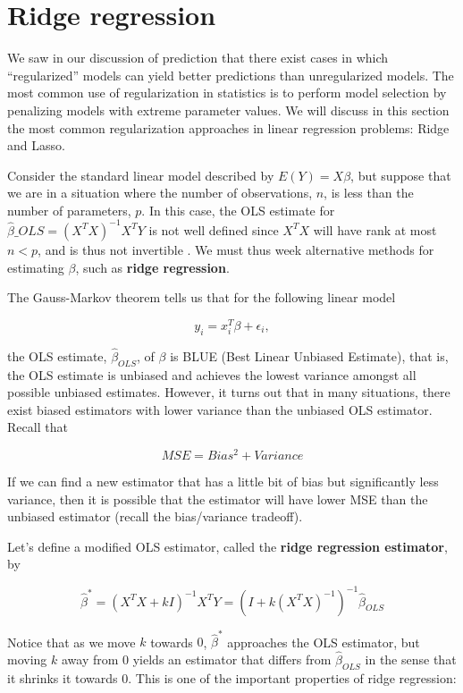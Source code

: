 \chapter{Ridge regression}
\label{ch:ridge}




We saw in our discussion of prediction that there exist cases in which ``regularized'' models can yield better predictions than unregularized models. The most common use of regularization in statistics is to perform model selection by penalizing models with extreme parameter values. We will discuss in this section the most common regularization approaches in linear regression problems: Ridge and Lasso.


Consider the standard linear model described by $E(Y) = X \beta$, but suppose that we are in a situation where the number of observations, $n$, is less than the number of parameters, $p$. In this case, the OLS estimate for $\hat{\beta}\_{OLS} = (X^TX)^{-1}X^TY$ is not well defined since $X^TX$ will have rank at most $n < p$, and is thus not invertible . We must thus week alternative methods for estimating $\beta$, such as \textbf{ridge regression}.

The Gauss-Markov theorem tells us that for the following linear model

$$y_i = x_i^T \beta + \epsilon_i,$$

the OLS estimate, $\hat{\beta}_{OLS}$, of $\beta$ is BLUE (Best Linear Unbiased Estimate), that is, the OLS estimate is unbiased and achieves the lowest variance amongst all possible unbiased estimates. However, it turns out that in many situations, there exist biased estimators with lower variance than the unbiased OLS estimator. Recall that

$$MSE = Bias^2 + Variance$$


If we can find a new estimator that has a little bit of bias but significantly less variance, then it is possible that the estimator will have lower MSE than the unbiased estimator (recall the bias/variance tradeoff).


Let's define a modified OLS estimator, called the \textbf{ridge regression estimator}, by

$$\hat{\beta}^* = \left(X^TX + kI\right)^{-1}X^TY = \left(I + k(X^TX)^{-1}\right)^{-1}\hat{\beta}_{OLS}$$


Notice that as we move $k$ towards $0$, $\hat{\beta}^*$ approaches the OLS estimator, but moving $k$ away from $0$ yields an estimator that differs from $\hat{\beta}_{OLS}$ in the sense that it shrinks it towards $0$. This is one of the important properties of ridge regression:

